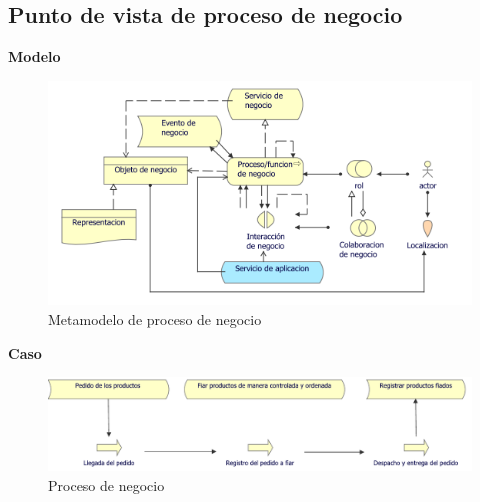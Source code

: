 	\subsection{Punto de vista de proceso de negocio}
	{ 
		
		\textbf{Modelo}\\
		\begin{figure}[H]
			\centering
			\includegraphics[width=0.8\linewidth]{development/proceso.png}
			\caption{Metamodelo de proceso de negocio}
		\end{figure}
		
		\textbf{Caso}\\
		
		\begin{figure}[H]
			\centering
			\includegraphics[width=0.8\linewidth]{development/proceso.pdf}
			\caption{Proceso de negocio}
		\end{figure}
	}
	

